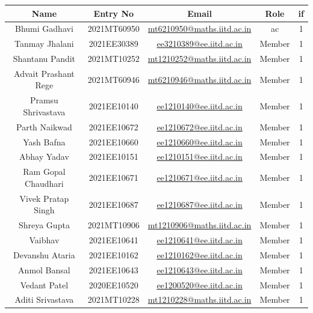 \documentclass[12pt]{article} %
\begin{document}
\begin{table}[h!]
\centering
\begin{tabular}{|c|c|c|c|c|}
\hline
Name & Entry No & Email & Role & \acrshort{if} \\
\hline
Bhumi Gadhavi & 2021MT60950 & \href{mailto:mt6210950@maths.iitd.ac.in}{mt6210950@maths.iitd.ac.in} & \acrshort{ac} & 1 \\
Tanmay Jhalani & 2021EE30389 & \href{mailto:ee3210389@ee.iitd.ac.in}{ee3210389@ee.iitd.ac.in} & Member & 1 \\
Shantanu Pandit & 2021MT10252 & \href{mailto:mt1210252@maths.iitd.ac.in}{mt1210252@maths.iitd.ac.in} & Member & 1 \\
Advait Prashant Rege & 2021MT60946 & \href{mailto:mt6210946@maths.iitd.ac.in}{mt6210946@maths.iitd.ac.in} & Member & 1 \\
Pramsu Shrivastava & 2021EE10140 & \href{mailto:ee1210140@ee.iitd.ac.in}{ee1210140@ee.iitd.ac.in} & Member & 1 \\
Parth Naikwad & 2021EE10672 & \href{mailto:ee1210672@ee.iitd.ac.in}{ee1210672@ee.iitd.ac.in} & Member & 1 \\
Yash Bafna & 2021EE10660 & \href{mailto:ee1210660@ee.iitd.ac.in}{ee1210660@ee.iitd.ac.in} & Member & 1 \\
Abhay Yadav & 2021EE10151 & \href{mailto:ee1210151@ee.iitd.ac.in}{ee1210151@ee.iitd.ac.in} & Member & 1 \\
Ram Gopal Chaudhari & 2021EE10671 & \href{mailto:ee1210671@ee.iitd.ac.in}{ee1210671@ee.iitd.ac.in} & Member & 1 \\
Vivek Pratap Singh & 2021EE10687 & \href{mailto:ee1210687@ee.iitd.ac.in}{ee1210687@ee.iitd.ac.in} & Member & 1 \\
Shreya Gupta & 2021MT10906 & \href{mailto:mt1210906@maths.iitd.ac.in}{mt1210906@maths.iitd.ac.in} & Member & 1 \\
Vaibhav & 2021EE10641 & \href{mailto:ee1210641@ee.iitd.ac.in}{ee1210641@ee.iitd.ac.in} & Member & 1 \\
Devanshu Ataria & 2021EE10162 & \href{mailto:ee1210162@ee.iitd.ac.in}{ee1210162@ee.iitd.ac.in} & Member & 1 \\
Anmol Bansal & 2021EE10643 & \href{mailto:ee1210643@ee.iitd.ac.in}{ee1210643@ee.iitd.ac.in} & Member & 1 \\
Vedant Patel & 2020EE10520 & \href{mailto:ee1200520@ee.iitd.ac.in}{ee1200520@ee.iitd.ac.in} & Member & 1 \\
Aditi Srivastava & 2021MT10228 & \href{mailto:mt1210228@maths.iitd.ac.in}{mt1210228@maths.iitd.ac.in} & Member & 1 \\

\end{tabular}
\end{table}
\end{document}
